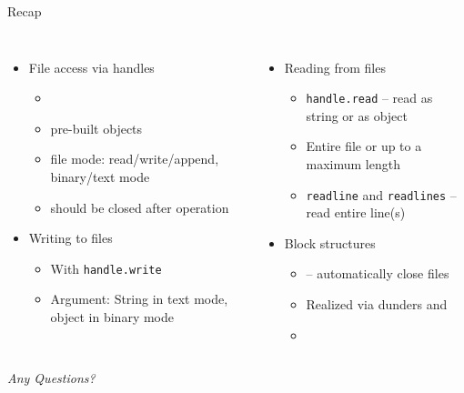 
\begin{frame}[t,plain]
\titlepage
\end{frame}


\begin{frame}{Recap}
%
\begin{columns}[T]
\begin{itemize}
\item File access via handles
	\begin{itemize}
	\item {}
	\item pre-built objects
	\item file mode: read/write/append, binary/text mode
	\item should be closed after operation
	\end{itemize}
\item Writing to files
	\begin{itemize}
	\item With \texttt{handle.write}
	\item Argument: String in text mode,  object in binary mode
	\end{itemize}
\end{itemize}
%
\begin{itemize}
\item Reading from files
	\begin{itemize}
	\item \texttt{handle.read} -- read as string or as  object
	\item Entire file or up to a maximum length
	\item \texttt{readline} and \texttt{readlines} -- read entire line(s)
	\end{itemize}
\item Block structures
	\begin{itemize}
	\item {} -- automatically close files
	\item Realized via dunders  and 
	\item {}
	\end{itemize}
\end{itemize}
\end{columns}
%
\begin{center}
	\emph{Any Questions?}
\end{center}
%
\end{frame}

